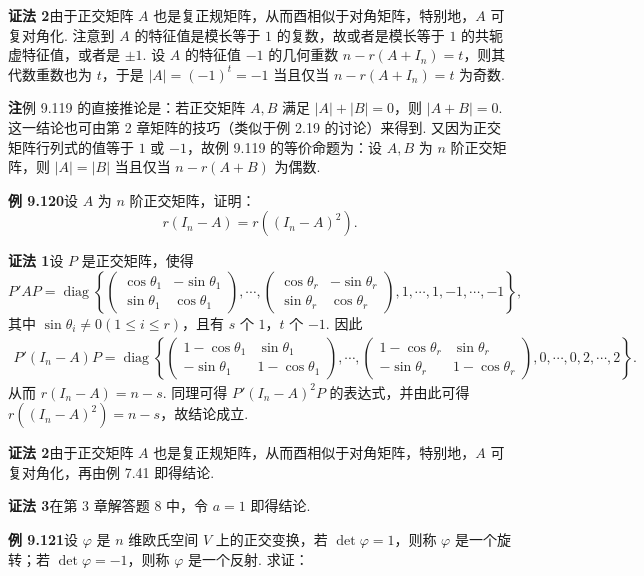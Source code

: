 \documentclass[UTF8, 12pt, fontset=fandol, oneside]{ctexart}
\begin{document}
\noindent\textbf{证法 2}\quad 由于正交矩阵 $A$ 也是复正规矩阵，从而酉相似于对角矩阵，特别地，$A$ 可复对角化. 注意到 $A$ 的特征值是模长等于 $1$ 的复数，故或者是模长等于 $1$ 的共轭虚特征值，或者是 $\pm1$. 设 $A$ 的特征值 $-1$ 的几何重数 $n-r(A+I_n)=t$，则其代数重数也为 $t$，于是 $|A|=(-1)^t=-1$ 当且仅当 $n-r(A+I_n)=t$ 为奇数.

\noindent\textbf{注}\quad 例 9.119 的直接推论是：若正交矩阵 $A,B$ 满足 $|A|+|B|=0$，则 $|A+B|=0$. 这一结论也可由第 2 章矩阵的技巧（类似于例 2.19 的讨论）来得到. 又因为正交矩阵行列式的值等于 $1$ 或 $-1$，故例 9.119 的等价命题为：设 $A,B$ 为 $n$ 阶正交矩阵，则 $|A|=|B|$ 当且仅当 $n-r(A+B)$ 为偶数.

\noindent\textbf{例 9.120}\quad 设 $A$ 为 $n$ 阶正交矩阵，证明：
\[
r(I_n-A)=r((I_n-A)^2).
\]

\noindent\textbf{证法 1}\quad 设 $P$ 是正交矩阵，使得
\[
P'AP=\operatorname{diag}\left\{
\begin{pmatrix}
\cos\theta_1&-\sin\theta_1\\
\sin\theta_1&\cos\theta_1
\end{pmatrix},\cdots,
\begin{pmatrix}
\cos\theta_r&-\sin\theta_r\\
\sin\theta_r&\cos\theta_r
\end{pmatrix},
1,\cdots,1,-1,\cdots,-1
\right\},
\]
其中 $\sin\theta_i\ne0(1\le i\le r)$，且有 $s$ 个 $1$，$t$ 个 $-1$. 因此
\[
\begin{aligned}
P'(I_n-A)P
=\operatorname{diag}\left\{
\begin{pmatrix}
1-\cos\theta_1&\sin\theta_1\\
-\sin\theta_1&1-\cos\theta_1
\end{pmatrix},\cdots,
\begin{pmatrix}
1-\cos\theta_r&\sin\theta_r\\
-\sin\theta_r&1-\cos\theta_r
\end{pmatrix},
0,\cdots,0,2,\cdots,2
\right\}.
\end{aligned}
\]
从而 $r(I_n-A)=n-s$. 同理可得 $P'(I_n-A)^2P$ 的表达式，并由此可得 $r((I_n-A)^2)=n-s$，故结论成立.

\noindent\textbf{证法 2}\quad 由于正交矩阵 $A$ 也是复正规矩阵，从而酉相似于对角矩阵，特别地，$A$ 可复对角化，再由例 7.41 即得结论.

\noindent\textbf{证法 3}\quad 在第 3 章解答题 8 中，令 $a=1$ 即得结论.

\noindent\textbf{例 9.121}\quad 设 $\varphi$ 是 $n$ 维欧氏空间 $V$ 上的正交变换，若 $\det\varphi=1$，则称 $\varphi$ 是一个旋转；若 $\det\varphi=-1$，则称 $\varphi$ 是一个反射. 求证：
\end{document}
